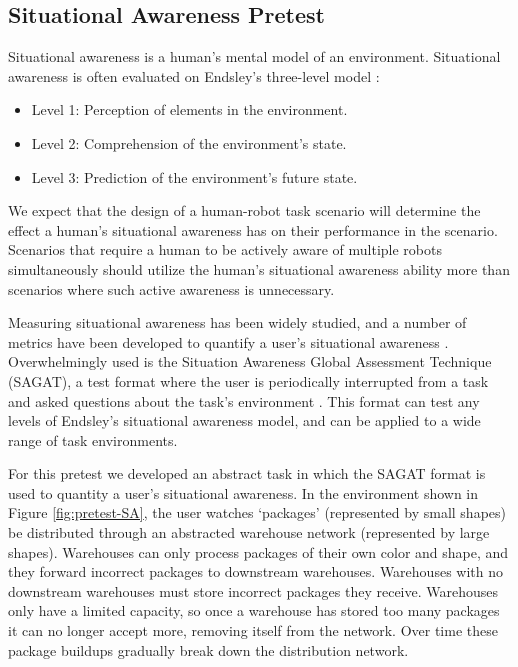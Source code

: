 \documentclass[letterpaper, 10 pt, conference]{ieeeconf}  %
\begin{document}
\subsection{Situational Awareness Pretest}

Situational awareness is a human's mental model of an environment. Situational awareness is often evaluated on Endsley's three-level model \cite{endsley1995}:

\begin{itemize}
    \item[] Level 1: Perception of elements in the environment.
    \item[] Level 2: Comprehension of the environment's state.
    \item[] Level 3: Prediction of the environment's future state.
\end{itemize}

We expect that the design of a human-robot task scenario will determine the effect a human's situational awareness has on their performance in the scenario. Scenarios that require a human to be actively aware of multiple robots simultaneously should utilize the human's situational awareness ability more than scenarios where such active awareness is unnecessary.

Measuring situational awareness has been widely studied, and a number of metrics have been developed to quantify a user's situational awareness \cite{salmon2009measuring,paletta2017towards, endsley1988situation}.  Overwhelmingly used is the Situation Awareness Global Assessment Technique (SAGAT), a test format where the user is periodically interrupted from a task and asked questions about the task's environment \cite{endsley1988situation}. This format can test any levels of Endsley's situational awareness model, and can be applied to a wide range of task environments. 

For this pretest we developed an abstract task in which the SAGAT format is used to quantity a user's situational awareness.  In the environment shown in Figure \ref{fig:pretest-SA}, the user watches `packages' (represented by small shapes) be distributed through an abstracted warehouse network (represented by large shapes).  Warehouses can only process packages of their own color and shape, and they forward incorrect packages to downstream warehouses. Warehouses with no downstream warehouses must store incorrect packages they receive. Warehouses only have a limited capacity, so once a warehouse has stored too many packages it can no longer accept more, removing itself from the network. Over time these package buildups gradually break down the distribution network.
\end{document}
